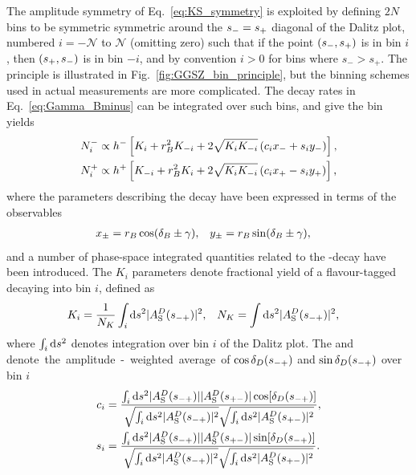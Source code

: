 The amplitude symmetry of Eq.~\eqref{eq:KS_symmetry} is exploited by defining $2N$ bins to be symmetric symmetric around the $s_-=s_+$ diagonal of the Dalitz plot, numbered $i=-\mathcal N$ to $\mathcal N$ (omitting zero) such that if the point $(s_-, s_+)$ is in bin $i$, then $(s_+, s_-)$ is in bin $-i$, and by convention $i>0$ for bins where $s_- >s_+$. The principle is illustrated in Fig.~\ref{fig:GGSZ_bin_principle}, but the binning schemes used in actual measurements are more complicated. The decay rates in Eq.~\eqref{eq:Gamma_Bminus} can be integrated over such bins, and give the bin yields
\begin{align}
\begin{split}    \label{eq:base_GGSZ_yields}
    N^-_i &\propto h^- \left[K_i + r_{B}^2K_{-i} + 2\sqrt{K_iK_{-i}}\left(c_ix_-+s_iy_-\right)\right], \\
    N^+_i &\propto h^+ \left[K_{-i} + r_{B}^2K_i + 2\sqrt{K_iK_{-i}}\left(c_ix_+-s_iy_+\right)\right],
\end{split}
\end{align}
where the parameters describing the \B decay have been expressed in terms of the observables
\begin{align}
    x_\pm &= r_{B} \cos (\delta_{B} \pm \gamma), & y_\pm &= r_{B} \sin (\delta_{B} \pm \gamma),
\end{align}
 and a number of phase-space integrated quantities related to the \D-decay have been introduced. The $K_i$ parameters denote fractional yield of a flavour-tagged \Dz decaying into bin $i$, defined as
\begin{align}\label{eq:base_ki}
    K_i &= \frac{1}{N_K}\int_i\text{d}s^2 |A_{\rm S}^{D}(s_{-+})|^2, &
    N_K &=\int\text{d}s^2 |A_{\rm S}^{D}(s_{-+})|^2,
\end{align}
where $\int_i \text d s^2$ denotes integration over bin $i$ of the Dalitz plot. The \ci and \si denote the amplitude-weighted average of $\cos \delta_D(s_{-+})$ and $\sin \delta_D(s_{-+})$ over bin $i$
\begin{align}\label{eq:ci_si}
\begin{split}
    c_i &= \frac
    {\int_i \text{d}s^2 |A_{\rm S}^{D}(s_{-+})||A_{\rm S}^{D}(s_{+-})|\cos[\delta_D(s_{-+})]}
    {\sqrt{\int_i \text{d}s^2 |A_{\rm S}^{D}(s_{-+})|^2}\sqrt{\int_i \text{d}s^2 |A_{\rm S}^{D}(s_{+-})|^2}}, \\
    s_i &= \frac
    {\int_i \text{d}s^2 |A_{\rm S}^{D}(s_{-+})||A_{\rm S}^{D}(s_{+-})|\sin[\delta_D(s_{-+})]}
    {\sqrt{\int_i \text{d}s^2 |A_{\rm S}^{D}(s_{-+})|^2}\sqrt{\int_i \text{d}s^2 |A_{\rm S}^{D}(s_{+-})|^2}}.
\end{split}
\end{align}
